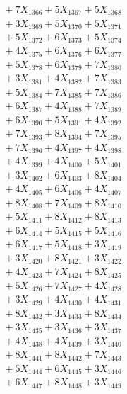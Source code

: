 \documentclass[a4paper,10pt]{article}
\begin{document}
{\begin{align}
&\;  + 7 X_{1366} + 5 X_{1367} + 5 X_{1368} \\[0.3ex]
&\;  + 3 X_{1369} + 5 X_{1370} + 5 X_{1371} \\[0.3ex]
&\;  + 5 X_{1372} + 6 X_{1373} + 5 X_{1374} \\[0.3ex]
&\;  + 4 X_{1375} + 6 X_{1376} + 6 X_{1377} \\[0.3ex]
&\;  + 5 X_{1378} + 6 X_{1379} + 7 X_{1380} \\[0.3ex]
&\;  + 3 X_{1381} + 4 X_{1382} + 7 X_{1383} \\[0.3ex]
&\;  + 5 X_{1384} + 7 X_{1385} + 7 X_{1386} \\[0.3ex]
&\;  + 6 X_{1387} + 4 X_{1388} + 7 X_{1389} \\[0.5ex]\allowbreak
&\;  + 6 X_{1390} + 5 X_{1391} + 4 X_{1392} \\[0.3ex]
&\;  + 7 X_{1393} + 8 X_{1394} + 7 X_{1395} \\[0.3ex]
&\;  + 7 X_{1396} + 4 X_{1397} + 4 X_{1398} \\[0.3ex]
&\;  + 4 X_{1399} + 4 X_{1400} + 5 X_{1401} \\[0.3ex]
&\;  + 3 X_{1402} + 6 X_{1403} + 8 X_{1404} \\[0.3ex]
&\;  + 4 X_{1405} + 6 X_{1406} + 4 X_{1407} \\[0.3ex]
&\;  + 8 X_{1408} + 7 X_{1409} + 8 X_{1410} \\[0.3ex]
&\;  + 5 X_{1411} + 8 X_{1412} + 8 X_{1413} \\[0.3ex]
&\;  + 6 X_{1414} + 5 X_{1415} + 5 X_{1416} \\[0.3ex]
&\;  + 6 X_{1417} + 5 X_{1418} + 3 X_{1419} \\[0.5ex]\allowbreak
&\;  + 3 X_{1420} + 8 X_{1421} + 3 X_{1422} \\[0.3ex]
&\;  + 4 X_{1423} + 7 X_{1424} + 8 X_{1425} \\[0.3ex]
&\;  + 5 X_{1426} + 7 X_{1427} + 4 X_{1428} \\[0.3ex]
&\;  + 3 X_{1429} + 4 X_{1430} + 4 X_{1431} \\[0.3ex]
&\;  + 8 X_{1432} + 3 X_{1433} + 8 X_{1434} \\[0.3ex]
&\;  + 3 X_{1435} + 3 X_{1436} + 3 X_{1437} \\[0.3ex]
&\;  + 4 X_{1438} + 4 X_{1439} + 3 X_{1440} \\[0.3ex]
&\;  + 8 X_{1441} + 8 X_{1442} + 7 X_{1443} \\[0.3ex]
&\;  + 5 X_{1444} + 6 X_{1445} + 3 X_{1446} \\[0.3ex]
&\;  + 6 X_{1447} + 8 X_{1448} + 3 X_{1449} \\[0.5ex]\allowbreak

\end{align}}
\end{document}
